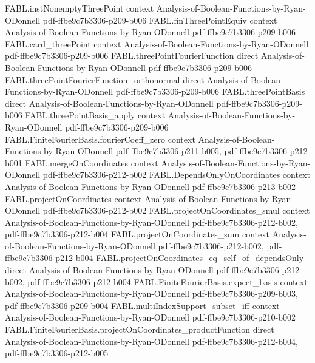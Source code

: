 \begin{theorem}
\proofstep
  {FABL.instNonemptyThreePoint}
  {context}
  {Analysis-of-Boolean-Functions-by-Ryan-ODonnell}
  {pdf-ffbe9c7b3306-p209-b006}
\proofstep
  {FABL.finThreePointEquiv}
  {context}
  {Analysis-of-Boolean-Functions-by-Ryan-ODonnell}
  {pdf-ffbe9c7b3306-p209-b006}
\proofstep
  {FABL.card_threePoint}
  {context}
  {Analysis-of-Boolean-Functions-by-Ryan-ODonnell}
  {pdf-ffbe9c7b3306-p209-b006}
\proofstep
  {FABL.threePointFourierFunction}
  {direct}
  {Analysis-of-Boolean-Functions-by-Ryan-ODonnell}
  {pdf-ffbe9c7b3306-p209-b006}
\proofstep
  {FABL.threePointFourierFunction_orthonormal}
  {direct}
  {Analysis-of-Boolean-Functions-by-Ryan-ODonnell}
  {pdf-ffbe9c7b3306-p209-b006}
\proofstep
  {FABL.threePointBasis}
  {direct}
  {Analysis-of-Boolean-Functions-by-Ryan-ODonnell}
  {pdf-ffbe9c7b3306-p209-b006}
\proofstep
  {FABL.threePointBasis_apply}
  {context}
  {Analysis-of-Boolean-Functions-by-Ryan-ODonnell}
  {pdf-ffbe9c7b3306-p209-b006}
\proofstep
  {FABL.FiniteFourierBasis.fourierCoeff_zero}
  {context}
  {Analysis-of-Boolean-Functions-by-Ryan-ODonnell}
  {pdf-ffbe9c7b3306-p211-b005,
    pdf-ffbe9c7b3306-p212-b001}
\proofstep
  {FABL.mergeOnCoordinates}
  {context}
  {Analysis-of-Boolean-Functions-by-Ryan-ODonnell}
  {pdf-ffbe9c7b3306-p212-b002}
\proofstep
  {FABL.DependsOnlyOnCoordinates}
  {context}
  {Analysis-of-Boolean-Functions-by-Ryan-ODonnell}
  {pdf-ffbe9c7b3306-p213-b002}
\proofstep
  {FABL.projectOnCoordinates}
  {context}
  {Analysis-of-Boolean-Functions-by-Ryan-ODonnell}
  {pdf-ffbe9c7b3306-p212-b002}
\proofstep
  {FABL.projectOnCoordinates_smul}
  {context}
  {Analysis-of-Boolean-Functions-by-Ryan-ODonnell}
  {pdf-ffbe9c7b3306-p212-b002,
    pdf-ffbe9c7b3306-p212-b004}
\proofstep
  {FABL.projectOnCoordinates_sum}
  {context}
  {Analysis-of-Boolean-Functions-by-Ryan-ODonnell}
  {pdf-ffbe9c7b3306-p212-b002,
    pdf-ffbe9c7b3306-p212-b004}
\proofstep
  {FABL.projectOnCoordinates_eq_self_of_dependsOnly}
  {direct}
  {Analysis-of-Boolean-Functions-by-Ryan-ODonnell}
  {pdf-ffbe9c7b3306-p212-b002,
    pdf-ffbe9c7b3306-p212-b004}
\proofstep
  {FABL.FiniteFourierBasis.expect_basis}
  {context}
  {Analysis-of-Boolean-Functions-by-Ryan-ODonnell}
  {pdf-ffbe9c7b3306-p209-b003,
    pdf-ffbe9c7b3306-p209-b004}
\proofstep
  {FABL.multiIndexSupport_subset_iff}
  {context}
  {Analysis-of-Boolean-Functions-by-Ryan-ODonnell}
  {pdf-ffbe9c7b3306-p210-b002}
\proofstep
  {FABL.FiniteFourierBasis.projectOnCoordinates_productFunction}
  {direct}
  {Analysis-of-Boolean-Functions-by-Ryan-ODonnell}
  {pdf-ffbe9c7b3306-p212-b004,
    pdf-ffbe9c7b3306-p212-b005}
\proofstep

\end{theorem}
